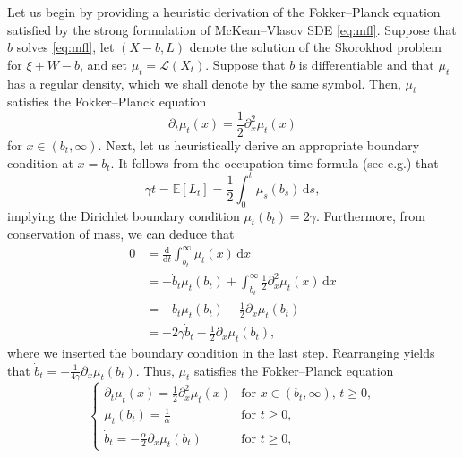 \documentclass[11pt, a4paper]{article}
\theoremstyle{plain}
\theoremstyle{definition}
\theoremstyle{remark}
\numberwithin{equation}{section}
\newcommand{\ev}{\mathbb{E}}
\renewcommand{\L}{\mathcal{L}}
\renewcommand{\d}{\mathrm{d}}
\begin{document}
Let us begin by providing a heuristic derivation of the Fokker--Planck equation satisfied by the strong formulation of McKean--Vlasov SDE \eqref{eq:mfl}. Suppose that $b$ solves \eqref{eq:mfl}, let $(X - b, L)$ denote the solution of the Skorokhod problem for $\xi + W - b$, and set $\mu_t = \L(X_t)$. Suppose that $b$ is differentiable and that $\mu_t$ has a regular density, which we shall denote by the same symbol. Then, $\mu_t$ satisfies the Fokker--Planck equation
\begin{equation*}
    \partial_t \mu_t(x) = \frac{1}{2} \partial_x^2 \mu_t(x)
\end{equation*}
for $x \in (b_t, \infty)$. Next, let us heuristically derive an appropriate boundary condition at $x = b_t$. It follows from the occupation time formula (see e.g.\@ \cite[Chapter VI, Corollary 1.6]{revuz_cmbm_1999}) that
\begin{equation*}
    \gamma t = \ev[L_t] = \frac{1}{2} \int_0^t \mu_s(b_s) \, \d s,
\end{equation*}
implying the Dirichlet boundary condition $\mu_t(b_t) = 2\gamma$. Furthermore, from conservation of mass, we can deduce that
\begin{align*}
    0 &= \frac{\d}{\d t} \int_{b_t}^{\infty} \mu_t(x) \, \d x \\
    &= - \dot{b}_t \mu_t(b_t) + \int_{b_t}^{\infty} \frac{1}{2} \partial_x^2 \mu_t(x) \, \d x \\
    &= -\dot{b}_t \mu_t(b_t) - \frac{1}{2} \partial_x \mu_t(b_t) \\
    &= -2\gamma \dot{b}_t - \frac{1}{2} \partial_x \mu_t(b_t),
\end{align*}
where we inserted the boundary condition in the last step. Rearranging yields that $\dot{b}_t = -\frac{1}{4\gamma} \partial_x \mu_t(b_t)$. Thus, $\mu_t$ satisfies the Fokker--Planck equation
\begin{equation} \label{eq:fpe}
\begin{cases}
    \partial_t \mu_t(x) = \frac{1}{2} \partial_x^2 \mu_t(x) &\text{for } x \in (b_t, \infty),\, t \geq 0, \\
    \mu_t(b_t) = \frac{1}{\alpha} &\text{for } t \geq 0, \\
    \dot{b}_t = -\frac{\alpha}{2} \partial_x \mu_t(b_t) &\text{for } t \geq 0,
\end{cases}
\end{equation}
\end{document}
